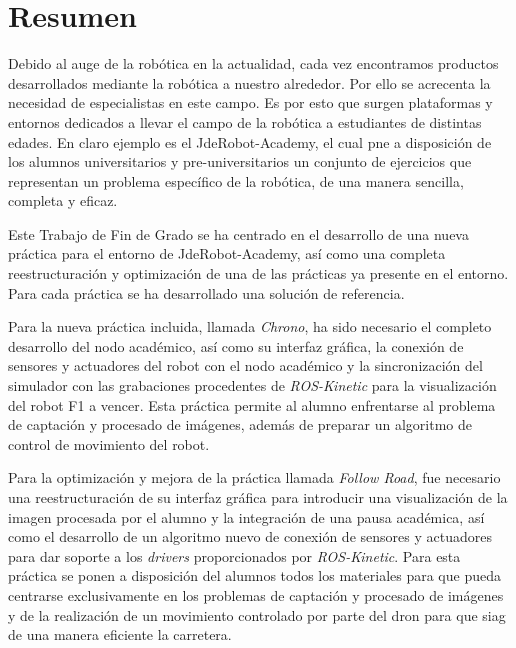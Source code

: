 \chapter*{Resumen}
\setlength{\parskip}{1ex}

Debido al auge de la robótica en la actualidad, cada vez encontramos productos desarrollados mediante la robótica a nuestro alrededor. Por ello se acrecenta la necesidad de especialistas en este campo. Es por esto que surgen plataformas y entornos dedicados a llevar el campo de la robótica a estudiantes de distintas edades. En claro ejemplo es el JdeRobot-Academy, el cual pne a disposición de los alumnos universitarios y pre-universitarios un conjunto de ejercicios que representan un problema específico de la robótica, de una manera sencilla, completa y eficaz.

Este Trabajo de Fin de Grado se ha centrado en el desarrollo de una nueva práctica para el entorno de JdeRobot-Academy, así como una completa reestructuración y optimización de una de las prácticas ya presente en el entorno. Para cada práctica se ha desarrollado una solución de referencia.

Para la nueva práctica incluida, llamada \textit{Chrono}, ha sido necesario el completo desarrollo del nodo académico, así como su interfaz gráfica, la conexión de sensores y actuadores del robot con el nodo académico y la sincronización del simulador con las grabaciones procedentes de \textit{ROS-Kinetic} para la visualización del robot F1 a vencer.
Esta práctica permite al alumno enfrentarse al problema de captación y procesado de imágenes, además de preparar un algoritmo de control de movimiento del robot.

Para la optimización y mejora de la práctica llamada \textit{Follow Road}, fue necesario una reestructuración de su interfaz gráfica para introducir una visualización de la imagen procesada por el alumno y la integración de una pausa académica, así como el desarrollo de un algoritmo nuevo de conexión de sensores y actuadores para dar soporte a los \textit{drivers} proporcionados por \textit{ROS-Kinetic}.
Para esta práctica se ponen a disposición del alumnos todos los materiales para que pueda centrarse exclusivamente en los problemas de captación y procesado de imágenes y de la realización de un movimiento controlado por parte del dron para que siag de una manera eficiente la carretera.